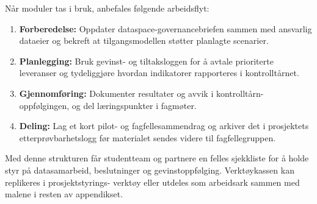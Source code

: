 Når moduler tas i bruk, anbefales følgende arbeidsflyt:

\begin{enumerate}[label=\alph*.]
    \item \textbf{Forberedelse:} Oppdater dataspace-governancebriefen sammen med ansvarlig dataeier og
    bekreft at tilgangsmodellen støtter planlagte scenarier.
    \item \textbf{Planlegging:} Bruk gevinst- og tiltaksloggen for å avtale prioriterte leveranser og
    tydeliggjøre hvordan indikatorer rapporteres i kontrolltårnet.
    \item \textbf{Gjennomføring:} Dokumenter resultater og avvik i kontrolltårn-oppfølgingen, og del
    læringspunkter i fagmøter.
    \item \textbf{Deling:} Lag et kort pilot- og fagfellesammendrag og arkiver det i prosjektets
    etterprøvbarhetslogg før materialet sendes videre til fagfellegruppen.
\end{enumerate}

Med denne strukturen får studentteam og partnere en felles sjekkliste for å holde styr på
datasamarbeid, beslutninger og gevinstoppfølging. Verktøykassen kan replikeres i prosjektstyrings-
verktøy eller utdeles som arbeidsark sammen med malene i resten av appendikset.
